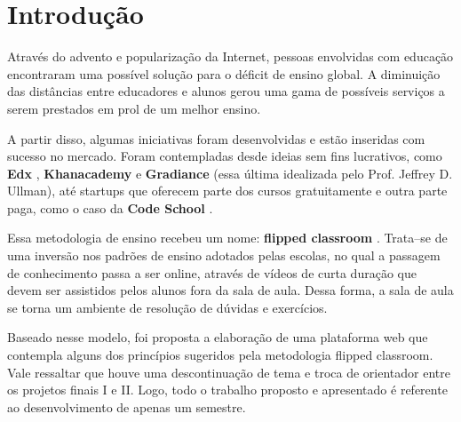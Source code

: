 \documentclass[graduacao,brazil]{ThesisPUC}
\begin{document}

\chapter{Introdu\c{c}\~{a}o}

Atrav\'{e}s do advento e populariza\c{c}\~{a}o da Internet, pessoas envolvidas com educa\c{c}\~{a}o
encontraram uma poss\'{i}vel solu\c{c}\~{a}o para o d\'{e}ficit de ensino global. A diminui\c{c}\~{a}o
das dist\^{a}ncias entre educadores e alunos gerou uma gama de poss\'{i}veis servi\c{c}os a serem prestados
em prol de um melhor ensino.

A partir disso, algumas iniciativas foram desenvolvidas e est\~{a}o inseridas com sucesso no
mercado. Foram contempladas desde ideias sem fins lucrativos, como \textbf{Edx} \cite{Edx}, 
\textbf{Khanacademy} \cite{Khanacademy} e \textbf{Gradiance} \cite{Gradiance} (essa \'{u}ltima idealizada 
pelo Prof. Jeffrey D. Ullman), at\'{e} startups que oferecem parte dos cursos gratuitamente e outra 
parte paga, como o caso da \textbf{Code School} \cite{CodeSchool}.

Essa metodologia de ensino recebeu um nome: \textbf{flipped classroom} \cite{FlippedLearning}.
Trata--se de uma invers\~{a}o nos padr\~{o}es de ensino adotados pelas escolas, no qual a passagem de
conhecimento passa a ser online, atrav\'{e}s de v\'{i}deos de curta dura\c{c}\~{a}o que devem ser assistidos
pelos alunos fora da sala de aula. Dessa forma, a sala de aula se torna um ambiente de resolu\c{c}\~{a}o de 
d\'{u}vidas e exerc\'{i}cios.

Baseado nesse modelo, foi proposta a elabora\c{c}\~{a}o de uma plataforma web que contempla alguns dos princ\'{i}pios
sugeridos pela metodologia flipped classroom. Vale ressaltar que houve uma descontinua\c{c}\~{a}o de tema e troca de 
orientador entre os projetos finais I e II. Logo, todo o trabalho proposto e apresentado \'{e} referente ao 
desenvolvimento de apenas um semestre.
\end{document}
